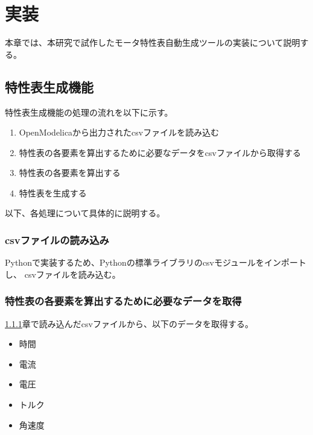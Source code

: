 \chapter{実装}\label{cha:Implementation}

本章では、本研究で試作したモータ特性表自動生成ツールの実装について説明する。

\section{特性表生成機能}\label{tokuseihyou_seisei}



特性表生成機能の処理の流れを以下に示す。
\begin{enumerate}
    \item OpenModelicaから出力されたcsvファイルを読み込む
    \item 特性表の各要素を算出するために必要なデータをcsvファイルから取得する
    \item 特性表の各要素を算出する
    \item 特性表を生成する
\end{enumerate}

以下、各処理について具体的に説明する。

\subsection{csvファイルの読み込み}\label{sub:csvfairu}
Pythonで実装するため、Pythonの標準ライブラリのcsvモジュールをインポートし、
csvファイルを読み込む。

\subsection{特性表の各要素を算出するために必要なデータを取得}\label{sub:syutoku_data}
\ref{sub:csvfairu}章で読み込んだcsvファイルから、以下のデータを取得する。

\begin{itemize}
    \item 時間
    \item 電流
    \item 電圧
    \item トルク
    \item 角速度
\end{itemize}


